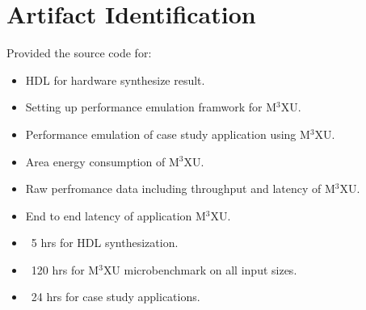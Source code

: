 \documentclass[conference]{IEEEtran}
\newcommand{\MPCMXU}[1]{M$^{3}$XU}
\begin{document}
\section{Artifact Identification}


\newartifact

\artrel
Provided the source code for:
\begin{itemize}
    \item HDL for hardware synthesize result.
    \item Setting up performance emulation framwork for \MPCMXU{}.
    \item Performance emulation of case study application using \MPCMXU{}.
\end{itemize}

\artexp
\begin{itemize}
    \item Area energy consumption of \MPCMXU{}.
    \item Raw perfromance data including throughput and latency of \MPCMXU{}.
    \item End to end latency of application \MPCMXU{}.
\end{itemize}


\arttime
\begin{itemize}
    \item ~5 hrs for HDL synthesization.
    \item ~120 hrs for \MPCMXU{} microbenchmark on all input sizes.
    \item ~24 hrs for case study applications.
\end{itemize}

\end{document}

